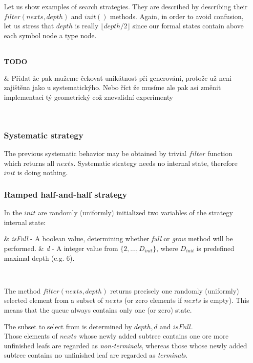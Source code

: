 \documentclass[12pt,a4paper]{report}
\newcommand{\Lets}{Let us\xspace}
\newcommand{\lets}{let us\xspace}
\newcommand{\setDots}[2]{ 
	\lbrace #1 , \dots , #2 \rbrace
}
\newenvironment{enum}
{\begin{easylist}[itemize]}
{\end{easylist}}
\newenvironment{todo}
{ ~\\[0.5em]
  {\color{red}\textbf{TODO}}
  \begin{easylist}[itemize]}
{ \end{easylist}
  ~}
\begin{document}
\Lets show examples of search strategies. 
They are described by describing 
their $filter(nexts,depth)$ 
and $init()$ methods. Again, in order to avoid confusion, 
\lets stress that $depth$ is really $\lfloor depth/2 \rfloor$ since
our formal states contain above each symbol node a type node.

\begin{todo}
 & Přidat že pak mužeme čekovat unikátnost při generování, protože už neni zajištěna 
   jako u systematickýho. Nebo říct že musíme ale pak asi změnit implementaci tý geometrický což znevalidní experimenty
\end{todo}


\subsubsection{Systematic strategy}

The previous systematic behavior may be obtained by trivial 
$filter$ function which returns all $nexts$.
Systematic strategy needs no internal state, 
therefore $init$ is doing nothing.

\subsubsection{Ramped half-and-half strategy}

In the $init$ are randomly (uniformly) initialized two variables of the
strategy internal state:

\begin{enum}
 & \textit{isFull} - A boolean value, determining whether \textit{full}
                     or \textit{grow} method will be performed.
 & \textit{d} - A integer value from $\setDots{2}{D_{init}}$, where 
                $D_{init}$ is predefined maximal depth (e.g. 6).                    
\end{enum}~


The method $filter(nexts,depth)$ returns precisely one randomly
(uniformly) selected  element from a subset of $nexts$
(or zero elements if $nexts$ is empty). 
This means that the queue always contains only one (or zero) state.

The subset to select from is determined by $depth, d$ and $isFull$.\\


Those elements of $nexts$ whose newly added subtree contains one ore more 
unfinished leafs are regarded as \textit{non-terminals}, whereas 
those whose newly added subtree contains no unfinished leaf are regarded as 
\textit{terminals}.\\
\end{document}
